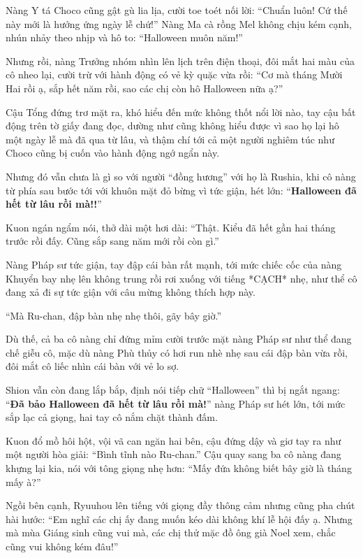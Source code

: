 \documentclass[../main.tex]{subfiles}
\begin{document}
Nàng Y tá Choco cũng gật gù lia lịa, cười toe toét nối lời: ``Chuẩn luôn! Cứ thế này mới là hưởng ứng ngày lễ chứ!'' Nàng Ma cà rồng Mel không chịu kém cạnh, nhún nhảy theo nhịp và hô to: ``Halloween muôn năm!''

Nhưng rồi, nàng Trưởng nhóm nhìn lên lịch trên điện thoại, đôi mắt hai màu của cô nheo lại, cười trừ với hành động có vẻ kỳ quặc vừa rồi: ``Cơ mà tháng Mười Hai rồi ạ, sắp hết năm rồi, sao các chị còn hô Halloween nữa ạ?''

Cậu Tổng đứng trơ mặt ra, khó hiểu đến mức không thốt nổi lời nào, tay cậu bất động trên tờ giấy đang đọc, dường như cũng không hiểu được vì sao họ lại hô một ngày lễ mà đã qua từ lâu, và thậm chí tới cả một người nghiêm túc như Choco cũng bị cuốn vào hành động ngớ ngẩn này.

Nhưng đó vẫn chưa là gì so với người ``đồng hương'' với họ là Rushia, khi cô nàng từ phía sau bước tới với khuôn mặt đỏ bừng vì tức giận, hét lớn: ``\textbf{Halloween đã hết từ lâu rồi mà!!}''

Kuon ngán ngẩm nói, thở dài một hơi dài: ``Thật. Kiểu đã hết gần hai tháng trước rồi đấy. Cũng sắp sang năm mới rồi còn gì.''

Nàng Pháp sư tức giận, tay đập cái bàn rất mạnh, tới mức chiếc cốc của nàng Khuyển bay nhẹ lên không trung rồi rơi xuống với tiếng *CẠCH* nhẹ, như thể cô đang xả đi sự tức giận với câu mừng không thích hợp này.

``Mà Ru-chan, đập bàn nhẹ nhẹ thôi, gãy bây giờ.''


Dù thế, cả ba cô nàng chỉ đứng mỉm cười trước mặt nàng Pháp sư như thể đang chế giễu cô, mặc dù nàng Phù thủy có hơi run nhè nhẹ sau cái đập bàn vừa rồi, đôi mắt cô liếc nhìn cái bàn với vẻ lo sợ.

Shion vẫn còn đang lắp bắp, định nói tiếp chữ ``Halloween'' thì bị ngắt ngang: ``\textbf{Đã bảo Halloween đã hết từ lâu rồi mà!}'' nàng Pháp sư hét lớn, tới mức sắp lạc cả giọng, hai tay cô nắm chặt thành đấm.

Kuon đổ mồ hôi hột, vội vã can ngăn hai bên, cậu đứng dậy và giơ tay ra như một người hòa giải: ``Bình tĩnh nào Ru-chan.'' Cậu quay sang ba cô nàng đang khựng lại kia, nói với tông giọng nhẹ hơn: ``Mấy đứa không biết bây giờ là tháng mấy à?''

Ngồi bên cạnh, Ryuuhou lên tiếng với giọng đầy thông cảm nhưng cũng pha chút hài hước: ``Em nghĩ các chị ấy đang muốn kéo dài không khí lễ hội đấy ạ. Nhưng mà mùa Giáng sinh cũng vui mà, các chị thử mặc đồ ông già Noel xem, chắc cũng vui không kém đâu!''
\end{document}

